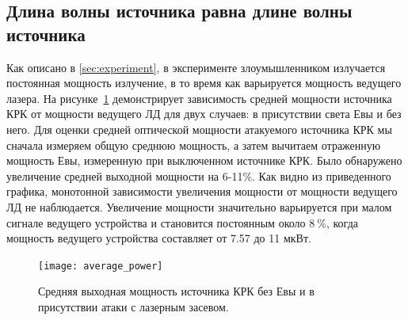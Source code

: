 \subsection{Длина волны источника равна длине волны источника}

Как описано в \cref{sec:experiment}, в эксперименте злоумышленником излучается постоянная мощность излучение, в то время как варьируется мощность ведущего лазера. На рисунке~\ref{fig:average_power} демонстрирует зависимость средней мощности источника КРК от мощности ведущего ЛД для двух случаев: в присутствии света Евы и без него. Для оценки средней оптической мощности атакуемого источника КРК мы сначала измеряем общую среднюю мощность, а затем вычитаем отраженную мощность Евы, измеренную при выключенном источнике КРК. Было обнаружено увеличение средней выходной мощности на 6-11\%. Как видно из приведенного графика, монотонной зависимости увеличения мощности от мощности ведущего ЛД не наблюдается. Увеличение мощности значительно варьируется при малом сигнале ведущего устройства и становится постоянным около $8~\%$, когда мощность ведущего устройства составляет от 7.57 до 11 мкВт.
\begin{figure}
\texttt{[image: average\_power]}
\caption{Средняя выходная мощность источника КРК без Евы и в присутствии атаки с лазерным засевом.}
\label{fig:average_power}
\end{figure}
